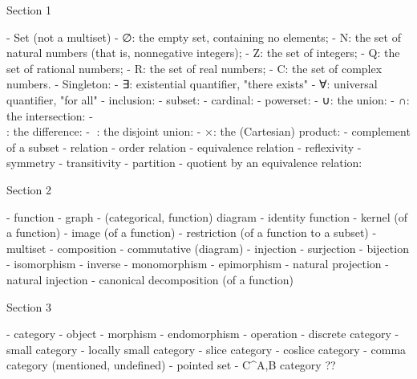 Section 1

  - Set (not a multiset)
  - ∅: the empty set, containing no elements;
  - N: the set of natural numbers (that is, nonnegative integers);
  - Z: the set of integers;
  - Q: the set of rational numbers;
  - R: the set of real numbers;
  - C: the set of complex numbers.
  - Singleton:
  - ∃: existential quantifier, "there exists"
  - ∀: universal quantifier, "for all"
  - inclusion:
  - subset:
  - cardinal:
  - powerset:
  - ∪: the union:
  - ∩: the intersection:
  - \\: the difference:
  - : the disjoint union:
  - ×: the (Cartesian) product:
  - complement of a subset
  - relation
  - order relation
  - equivalence relation
  - reﬂexivity
  - symmetry
  - transitivity
  - partition
  - quotient by an equivalence relation:


Section 2

  - function
  - graph
  - (categorical, function) diagram
  - identity function
  - kernel (of a function)
  - image (of a function)
  - restriction (of a function to a subset)
  - multiset
  - composition
  - commutative (diagram)
  - injection
  - surjection
  - bijection
  - isomorphism
  - inverse
  - monomorphism
  - epimorphism
  - natural projection
  - natural injection
  - canonical decomposition (of a function)


Section 3

  - category
  - object
  - morphism
  - endomorphism
  - operation
  - discrete category
  - small category
  - locally small category
  - slice category
  - coslice category
  - comma category (mentioned, undefined)
  - pointed set
  - C^A,B category ??